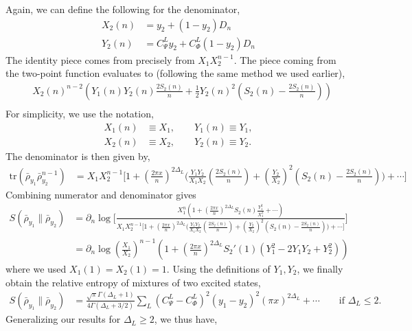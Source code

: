 \documentclass[11pt]{article}
\newcommand{\p}{\partial}
\newcommand{\lb}{\left(}
\newcommand{\rb}{\right)}
\begin{document}
Again, we can define the following for the denominator,
\begin{align}
    X_2(n) &= y_2 + (1-y_2)D_n \\
    Y_2(n) &=  C_\Psi^L y_2 + C_\Phi^L(1-y_2)D_n 
\end{align}
The identity piece comes from precisely from $X_1 X_2^{n-1}$. The piece coming from the two-point function evaluates to (following the same method we used earlier),
\begin{align}
    &X_2(n)^{n-2}\lb Y_1(n)Y_2 (n)\frac{2S_2(n)}{n} + \frac{1}{2}Y_2(n)^2 \lb S_2(n) - \frac{2S_2(n)}{n}\rb \rb \\
\end{align}
For simplicity, we use the notation,
\begin{align}
    X_1(n) &\equiv X_1 ,\qquad Y_1(n) \equiv Y_1 ,\\
    X_2(n)&\equiv X_2, \qquad Y_2(n) \equiv Y_2.
\end{align}
The denominator is then given by,
\begin{align}
    \text{tr}\lb \bar{\rho}_{y_1}\bar{\rho}_{y_2}^{n-1}  \rb &= X_1 X_2^{n-1} \Bigg[ 1+  \lb\frac{2\pi x}{n}\rb^{2\Delta_L} \Bigg(\frac{Y_1Y_2}{X_1X_2}\lb\frac{2S_2(n)}{n}\rb  + \lb\frac{Y_2}{X_2}\rb^2 \lb S_2(n)-\frac{2S_2(n)}{n}\rb\Bigg)+\cdots\Bigg]
\end{align}
Combining numerator and denominator gives
\begin{align}
    S(\bar{\rho}_{y_1} \| \bar{\rho}_{y_2} ) &= \p_n \log \Bigg[ \frac{X_1^n\lb1 + \lb\frac{2\pi x}{n}\rb^{2\Delta_L} S_2(n) \frac{Y_1^2}{X_1^2} + \cdots \rb}{X_1 X_2^{n-1} \Bigg[ 1+  \lb\frac{2\pi x}{n}\rb^{2\Delta_L} \Bigg(\frac{Y_1Y_2}{X_1X_2}\lb\frac{2S_2(n)}{n}\rb + \lb\frac{Y_2}{X_2}\rb^2 \lb S_2(n)-\frac{2S_2(n)}{n}\rb\Bigg)+\cdots\Bigg]}\Bigg] \\
    &= \p_n \log \lb \frac{X_1}{X_2}\rb^{n-1} \lb 1+ \lb\frac{2\pi x}{n}\rb^{2\Delta_L} S_2'(1) \lb Y_1^2 -2Y_1Y_2 +Y_2^2\rb\rb
\end{align}
where we used $X_1(1) = X_2(1)= 1$. Using the definitions of $Y_1,Y_2$, we finally obtain the relative entropy of mixtures of two excited states,
\begin{align}
    S(\bar{\rho}_{y_1} \| \bar{\rho}_{y_2} ) &= \frac{\sqrt{\pi} \Gamma(\Delta_L + 1)}{4\Gamma(\Delta_L + 3/2)}\sum_L (C_{\Psi }^L - C_{\Phi }^L)^2(y_1-y_2)^2 (\pi x)^{2\Delta_L} + \cdots \qquad \text{if }\Delta_L \leq 2.
\end{align}
Generalizing our results for $\Delta_L \geq 2$, we thus have,
\end{document}
